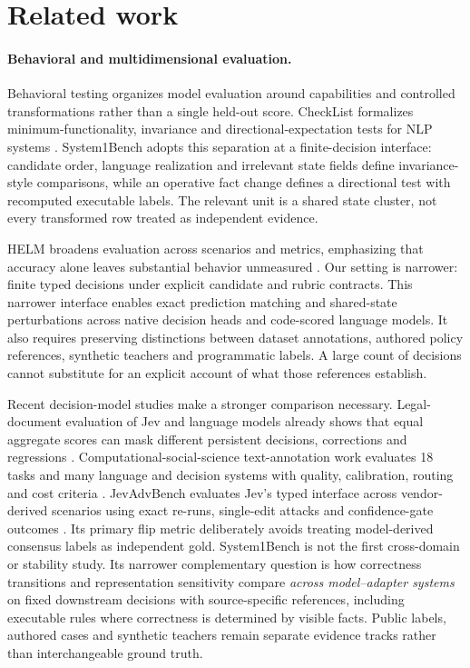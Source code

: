 \section{Related work}
\paragraph{Behavioral and multidimensional evaluation.}
Behavioral testing organizes model evaluation around capabilities and controlled transformations rather than a single held-out score. CheckList formalizes minimum-functionality, invariance and directional-expectation tests for NLP systems \citep{checklist}. System1Bench adopts this separation at a finite-decision interface: candidate order, language realization and irrelevant state fields define invariance-style comparisons, while an operative fact change defines a directional test with recomputed executable labels. The relevant unit is a shared state cluster, not every transformed row treated as independent evidence.

HELM broadens evaluation across scenarios and metrics, emphasizing that accuracy alone leaves substantial behavior unmeasured \citep{helm}. Our setting is narrower: finite typed decisions under explicit candidate and rubric contracts. This narrower interface enables exact prediction matching and shared-state perturbations across native decision heads and code-scored language models. It also requires preserving distinctions between dataset annotations, authored policy references, synthetic teachers and programmatic labels. A large count of decisions cannot substitute for an explicit account of what those references establish.

Recent decision-model studies make a stronger comparison necessary. Legal-document evaluation of Jev and language models already shows that equal aggregate scores can mask different persistent decisions, corrections and regressions \citep{legaldecisions}. Computational-social-science text-annotation work evaluates 18 tasks and many language and decision systems with quality, calibration, routing and cost criteria \citep{cssdecisions}. JevAdvBench evaluates Jev's typed interface across vendor-derived scenarios using exact re-runs, single-edit attacks and confidence-gate outcomes \citep{jevadvbench}. Its primary flip metric deliberately avoids treating model-derived consensus labels as independent gold. System1Bench is not the first cross-domain or stability study. Its narrower complementary question is how correctness transitions and representation sensitivity compare \emph{across model--adapter systems} on fixed downstream decisions with source-specific references, including executable rules where correctness is determined by visible facts. Public labels, authored cases and synthetic teachers remain separate evidence tracks rather than interchangeable ground truth.

